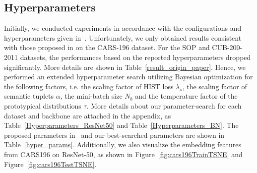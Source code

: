 \subsection{Hyperparameters}
Initially, we conducted experiments in accordance with the configurations and hyperparameters given in~\cite{lim2022hypergraph}. Unfortunately, we only obtained results consistent with those proposed in 
\cite{lim2022hypergraph} on the CARS-196 dataset. For the SOP and CUB-200-2011 datasets, the performances based on the reported hyperparameters dropped significantly. More details are shown in Table~\ref{result_origin_paper}. Hence, we performed an extended hyperparameter search utilizing Bayesian optimization for the following factors, i.e. the scaling factor of HIST loss $\lambda_s$, the scaling factor of semantic tuplets $\alpha$, the mini-batch size $N_b$ and the temperature factor of the prototypical distributions $\tau$. More details about our parameter-search for each dataset and backbone are attached in the appendix, as Table~\ref{Hyperparameters_ResNet50} and Table~\ref{Hyperparameters_BN}. The proposed parameters in~\cite{lim2022hypergraph} and our best-searched parameters are shown in Table~\ref{hyper_params}. Additionally, we also visualize the embedding features from CARS196 on ResNet-50, as shown in Figure~\ref{fig:cars196TrainTSNE} and Figure~\ref{fig:cars196TestTSNE}.

